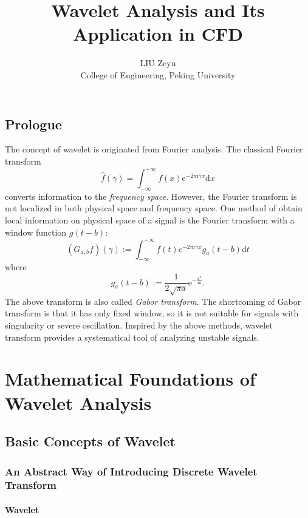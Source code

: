 \documentclass{book}
\newcommand{\assign}{:=}
\newcommand{\mathd}{\mathrm{d}}
\newcommand{\mathe}{\mathrm{e}}
\newcommand{\mathi}{\mathrm{i}}
\newcommand{\mathpi}{\pi}
\newcommand{\tmaffiliation}[1]{\\ #1}
\newcommand{\tmsamp}[1]{\textsf{#1}}
\newcommand{\tmtextit}[1]{{\itshape{#1}}}
\begin{document}
\title{Wavelet Analysis and Its Application in CFD}

\author{
  LIU Zeyu
  \tmaffiliation{College of Engineering, Peking University{\tmsamp{}}}
}

\maketitle

\chapter*{Prologue}

The concept of wavelet is originated from Fourier analysis. The classical
Fourier transform
\[ \hat{f} (\gamma) = \int_{- \infty}^{+ \infty} f (x) \mathe^{- 2 \mathpi
   \mathi \gamma x} \mathd x \]
converts information to the \tmtextit{frequency space}. However, the Fourier
transform is not localized in both physical space and frequency space. One
method of obtain local information on physical space of a signal is the
Fourier transform with a window function $g (t - b)$:
\[ (G_{a, b} f) (\gamma) \assign \int_{- \infty}^{+ \infty} f (t) e^{- 2
   \mathpi \mathi \gamma x} g_a (t - b) \mathd t \]
where
\[ g_a (t - b) \assign \frac{1}{2 \sqrt{\mathpi a}} \mathe^{- \frac{x^2}{4 a}}
   . \]
The above transform is also called \tmtextit{Gabor transform}. The shortcoming
of Gabor transform is that it has only fixed window, so it is not suitable for
signals with singularity or severe oscillation. Inspired by the above methods,
wavelet transform provides a systematical tool of analyzing unstable signals.

\part{Mathematical Foundations of Wavelet Analysis}

\chapter{Basic{} Concepts of Wavelet}

\section{An Abstract Way of Introducing Discrete Wavelet Transform}

\subsection{Wavelet}
\end{document}
